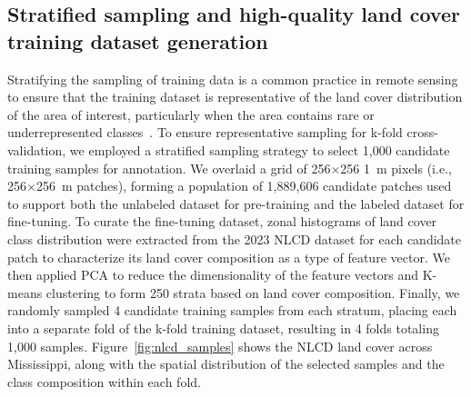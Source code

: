

\subsection{Stratified sampling and high-quality land cover training dataset generation}\label{sec:methodology:dataset_curation}

Stratifying the sampling of training data is a common practice in remote sensing to ensure that the training dataset is representative of the land cover distribution of the area of interest, particularly when the area contains rare or underrepresented classes~\citep{stehmanSamplingDesignsAccuracy2009, zhuOptimizingSelectionTraining2016, zhouTrainingDataSelection2020}.
To ensure representative sampling for k-fold cross-validation, we employed a stratified sampling strategy to select 1,000 candidate training samples for annotation.
We overlaid a grid of 256\(\times\)256 \SI{1}{\meter} pixels (i.e., 256\(\times\)\SI{256}{\meter} patches), forming a population of 1,889,606 candidate patches used to support both the unlabeled dataset for pre-training and the labeled dataset for fine-tuning.
To curate the fine-tuning dataset, zonal histograms of land cover class distribution were extracted from the 2023 NLCD dataset for each candidate patch to characterize its land cover composition as a type of feature vector.
We then applied PCA to reduce the dimensionality of the feature vectors and K-means clustering to form 250 strata based on land cover composition.
Finally, we randomly sampled 4 candidate training samples from each stratum, placing each into a separate fold of the k-fold training dataset, resulting in 4 folds totaling 1,000 samples.
Figure~\ref{fig:nlcd_samples} shows the NLCD land cover across Mississippi, along with the spatial distribution of the selected samples and the class composition within each fold.

